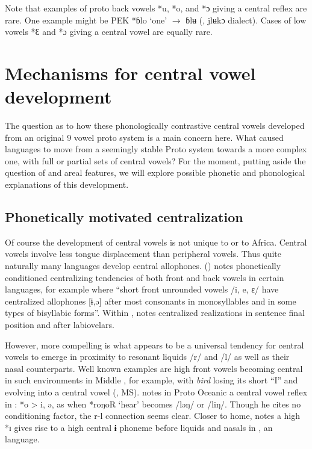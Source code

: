 \documentclass[output=paper
,newtxmath
,modfonts
,nonflat]{langsci/langscibook}
\begin{document}
Note that examples of proto back vowels *u, *o, and *ɔ giving a central reflex are rare.  One example might be PEK *ɓlo ‘one’ $\rightarrow$ ɓlʉ  (, jlʉkɔ dialect). Cases of low vowels *Ɛ and *ɔ giving a central vowel are equally rare.

\section{Mechanisms for central vowel development}\label{sec:zogbo:4}

The question as to how these phonologically contrastive central vowels developed from an original 9 vowel proto system is a main concern here. What caused languages to move from a seemingly stable Proto system towards a more complex one, with full or partial sets of central vowels? For the moment, putting aside the question of  and areal features, we will explore possible phonetic and phonological explanations of this development. 

\subsection{Phonetically motivated centralization}\label{sec:zogbo:4.1}

Of course the development of central vowels is not unique to  or to Africa. Central vowels involve less tongue displacement than peripheral vowels. Thus quite naturally many languages develop central allophones. \citeauthor{Welmers1973} (\citeyear[23, 25]{Welmers1973}) notes phonetically conditioned centralizing tendencies of both front and back vowels in certain  languages, for example  where “short front unrounded vowels /i, e, ɛ/ have centralized allophones [ɨ,ə] after most consonants in monosyllables and in some types of bisyllabic forms”. Within , \citet{Bentinck1978} notes centralized realizations in sentence final position and after labiovelars.

However, more compelling is what appears to be a universal tendency for central vowels to emerge in proximity to resonant liquids /r/ and /l/ as well as their nasal counterparts.  Well known examples are high front vowels becoming central in such environments in Middle , for example, with \textit{bird} losing its short “I” and evolving into a central vowel (\citeauthor{hickeyms}, MS). \citet[76]{Lynch2015} notes in Proto Oceanic a central vowel reflex in : *o > i, ə, as when *roŋoR ‘hear’ becomes /ləŋ/ or /liŋ/.  Though he cites no conditioning factor, the r-l connection seems clear. Closer to home, \citet{Morton2012} notes a high *ɪ gives rise to a high central \textbf{ɨ} phoneme before liquids and nasals in , an  language.  
\end{document}
